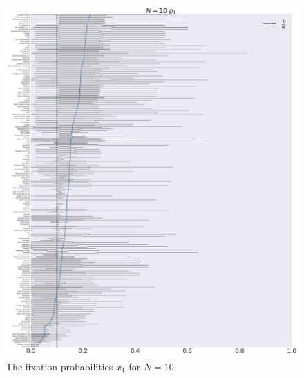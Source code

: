 \documentclass[10pt,letterpaper]{article}
\begin{document}
\begin{figure}[!hbtp]
    \centering
    \includegraphics[width=\textwidth]{./boxplot_10_invade.pdf}
    \caption{The fixation probabilities \(x_1\) for \(N=10\)}
\end{figure}
\end{document}

